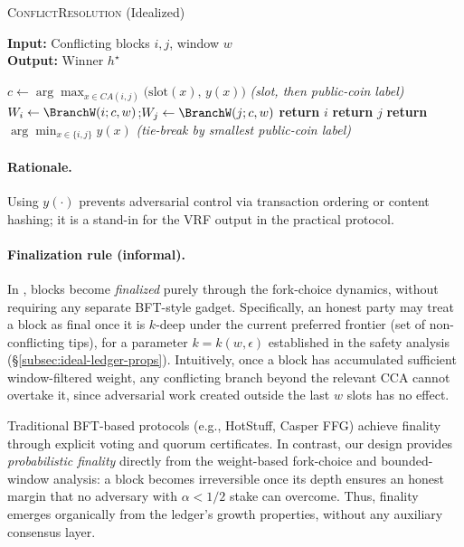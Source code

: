 \begin{algorithm}[htbp!]
\caption{\textsc{ConflictResolution} (Idealized)}\label{alg:cca-ideal}
\label{alg:ideal-cca}

\textbf{Input:} Conflicting blocks $i,j$, window $w$\\
\textbf{Output:} Winner $h^\star$
\begin{algorithmic}[1]
\State $c \leftarrow \arg\max_{x\in CA(i,j)} \big(\mathrm{slot}(x),\, y(x)\big)$ \hfill \textit{(slot, then public-coin label)} 
\State $W_i \leftarrow \BranchW(i; c, w)$;\quad $W_j \leftarrow \BranchW(j; c, w)$
 \State \textbf{return} $i$
 \State \textbf{return} $j$
\Else \State \textbf{return} $\arg\min_{x\in\{i,j\}} y(x)$ \hfill \textit{(tie-break by smallest public-coin label)} 
\EndIf
\end{algorithmic}
\end{algorithm}

\paragraph{Rationale.} 
Using $y(\cdot)$ prevents adversarial control via transaction ordering or content hashing; it is a stand-in for the VRF output in the practical protocol.




\paragraph{Finalization rule (informal).}
In \ProjIdeal, blocks become \emph{finalized} purely through the fork-choice dynamics,
without requiring any separate BFT-style gadget.
Specifically, an honest party may treat a block as final once it is
$k$-deep under the current 
preferred frontier (set of non-conflicting tips), 
for a parameter
$k=k(w,\epsilon)$ established in the safety analysis
(\S\ref{subsec:ideal-ledger-props}).
Intuitively, once a block has accumulated sufficient window-filtered weight,
any conflicting branch beyond the relevant CCA cannot overtake it,
since adversarial work created outside the last $w$ slots has no effect.

\begin{remark}
Traditional BFT-based protocols (e.g., HotStuff, Casper FFG) achieve finality
through explicit voting and quorum certificates.
In contrast, our design provides \emph{probabilistic finality} directly from
the weight-based fork-choice and bounded-window analysis:
a block becomes irreversible once its depth ensures an honest margin
that no adversary with $\alpha < 1/2$ stake can overcome.
Thus, finality emerges organically from the ledger’s growth properties,
without any auxiliary consensus layer.
\end{remark}




